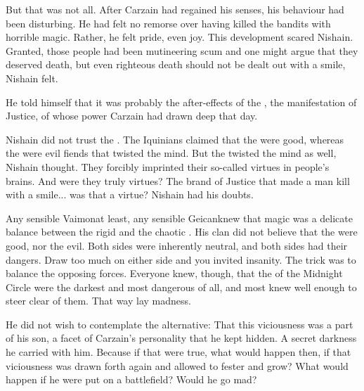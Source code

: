But that was not all. 
After Carzain had regained his senses, his behaviour had been disturbing. 
He had felt no remorse over having killed the bandits with horrible magic. 
Rather, he felt pride, even joy. 
This development scared Nishain. 
Granted, those people had been mutineering scum and one might argue that they deserved death, but even righteous death should not be dealt out with a smile, Nishain felt. 

He told himself that it was probably the after-effects of the \Izion, the manifestation of Justice, %
of whose power Carzain had drawn deep that day. 

Nishain did not trust the \sephiroth. 
The Iquinians claimed that the \sephiroth{} were good, whereas the \qliphoth{} were evil fiends that twisted the mind. 
But the \sephiroth{} twisted the mind as well, Nishain thought. 
They forcibly imprinted their so-called virtues in people's brains. 
And were they truly virtues? 
The brand of Justice that made a man kill with a smile... was that a virtue? 
Nishain had his doubts. 

Any sensible Vaimon\dash at least, any sensible Geican\dash knew that magic was a delicate balance between the rigid \sephiroth{} and the chaotic \qliphoth. 
His clan did not believe that the \sephiroth{} were good, nor the \qliphoth{} evil. 
Both sides were inherently neutral, and both sides had their dangers. 
Draw too much on either side and you invited insanity. 
The trick was to balance the opposing forces. 
Everyone knew, though, that the \qliphoth{} of the Midnight Circle were the darkest and most dangerous of all, and most knew well enough to steer clear of them. 
That way lay madness. 


He did not wish to contemplate the alternative: 
That this viciousness was a part of his son, 
a facet of Carzain's personality that he kept hidden.
A secret darkness he carried with him. 
Because if that were true, what would happen then, if that viciousness was drawn forth again and allowed to fester and grow?
What would happen if he were put on a battlefield? 
Would he go mad?







